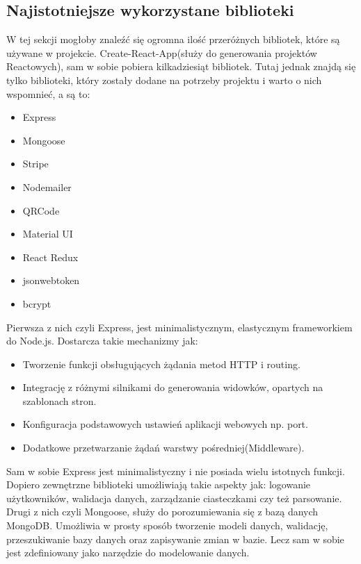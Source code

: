 \documentclass[12pt]{article}
\begin{document}
\begin{sloppypar}
{  \subsection{Najistotniejsze wykorzystane biblioteki}
  {
    W tej sekcji mogłoby znaleźć się ogromna ilość przeróżnych bibliotek, które są używane w projekcie. Create-React-App(służy do generowania projektów Reactowych), 
    sam w sobie pobiera kilkadziesiąt bibliotek. Tutaj jednak znajdą się tylko biblioteki, który zostały dodane na potrzeby projektu i warto o nich wspomnieć, a są to:
    \begin{itemize}
      \item Express
      \item Mongoose
      \item Stripe
      \item Nodemailer
      \item QRCode
      \item Material UI
      \item React Redux
      \item jsonwebtoken
      \item bcrypt
    \end{itemize}
    Pierwsza z nich czyli Express, jest minimalistycznym, elastycznym frameworkiem do Node.js. Dostarcza takie mechanizmy jak\cite{express}:
    \begin{itemize}
      \item Tworzenie funkcji obsługujących żądania metod HTTP i routing.
      \item Integrację z różnymi silnikami do generowania widowków, opartych na szablonach stron.
      \item Konfiguracja podstawowych ustawień aplikacji webowych np. port.
      \item Dodatkowe przetwarzanie żądań warstwy pośredniej(Middleware).
    \end{itemize}
    Sam w sobie Express jest minimalistyczny i nie posiada wielu istotnych funkcji. Dopiero zewnętrzne biblioteki umożliwiają takie aspekty jak: logowanie użytkowników,
    walidacja danych, zarządzanie ciasteczkami czy też parsowanie.\\

    Drugi z nich czyli Mongoose, służy do porozumiewania się z bazą danych MongoDB. Umożliwia w prosty sposób tworzenie modeli danych, walidację, przeszukiwanie bazy danych 
    oraz zapisywanie zmian w bazie. Lecz sam w sobie jest zdefiniowany jako narzędzie do modelowanie danych.\\

}}
\end{sloppypar}
\end{document}
